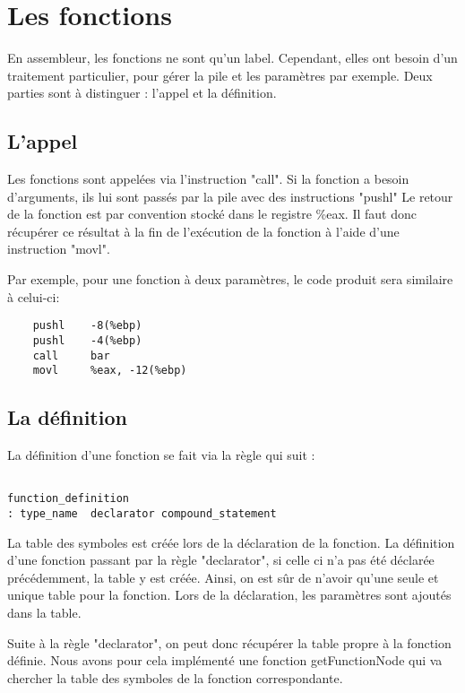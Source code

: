 \section{Les fonctions}

En assembleur, les fonctions ne sont qu'un label. Cependant, elles ont besoin d'un traitement particulier, pour gérer la pile et les paramètres par exemple.
Deux parties sont à distinguer : l'appel et la définition.

\subsection*{L'appel}

Les fonctions sont appelées via l'instruction "call".
Si la fonction a besoin d'arguments, ils lui sont passés par la pile avec des instructions "pushl"
Le retour de la fonction est par convention stocké dans le registre \%eax. Il faut donc récupérer ce résultat à la fin de l'exécution de la fonction à l'aide d'une instruction "movl".

Par exemple, pour une fonction à deux paramètres, le code produit sera similaire à celui-ci:

\begin{verbatim}
	pushl	 -8(%ebp)
	pushl	 -4(%ebp)
	call	 bar
	movl	 %eax, -12(%ebp) 
\end{verbatim}

\subsection*{La définition}

La définition d'une fonction se fait via la règle qui suit :

\begin{verbatim}
 
function_definition
: type_name  declarator compound_statement 

\end{verbatim}

La table des symboles est créée lors de la déclaration de la fonction. La définition d'une fonction passant par la règle "declarator", si celle ci n'a pas été déclarée précédemment, la table y est créée. Ainsi, on est sûr de n'avoir qu'une seule et unique table pour la fonction. Lors de la déclaration, les paramètres sont ajoutés dans la table.

Suite à la règle "declarator", on peut donc récupérer la table propre à la fonction définie. Nous avons pour cela implémenté une fonction getFunctionNode qui va chercher la table des symboles de la fonction correspondante.

